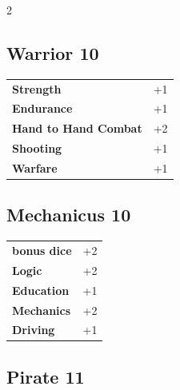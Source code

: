 \begin{multicols}{2}
\begin{tcolorbox}
    \subsection*{Warrior \hfill \small{10 }}
    \tcblower




\begin{tabular}{@{}ll@{}}
    \textbf{Strength} & +1\\
    \textbf{Endurance} & +1\\
    \textbf{Hand to Hand Combat} & +2\\
    \textbf{Shooting} & +1\\
    \textbf{Warfare} & +1\\
\end{tabular}


\end{tcolorbox}

\begin{tcolorbox}
    \subsection*{Mechanicus \hfill \small{10 }}
    \tcblower




\begin{tabular}{@{}ll@{}}
    \textbf{bonus dice} & +2\\
    \textbf{Logic} & +2\\
    \textbf{Education} & +1\\
    \textbf{Mechanics} & +2\\
    \textbf{Driving} & +1\\
\end{tabular}


\end{tcolorbox}

\begin{tcolorbox}
    \subsection*{Pirate \hfill \small{11 }}
    \tcblower





\end{tcolorbox}
\end{multicols}
